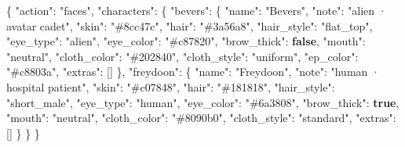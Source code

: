 \documentclass[
  12pt,
  letterpaper,
]{book}
\newenvironment{Shaded}{}{}
\newcommand{\DataTypeTok}[1]{\textcolor[rgb]{0.56,0.13,0.00}{#1}}
\newcommand{\FunctionTok}[1]{\textcolor[rgb]{0.02,0.16,0.49}{#1}}
\newcommand{\KeywordTok}[1]{\textcolor[rgb]{0.00,0.44,0.13}{\textbf{#1}}}
\newcommand{\OtherTok}[1]{\textcolor[rgb]{0.00,0.44,0.13}{#1}}
\newcommand{\StringTok}[1]{\textcolor[rgb]{0.25,0.44,0.63}{#1}}
\begin{document}
\begin{Shaded}
\begin{Highlighting}[]
\FunctionTok{\{}
  \DataTypeTok{"action"}\FunctionTok{:} \StringTok{"faces"}\FunctionTok{,}
  \DataTypeTok{"characters"}\FunctionTok{:} \FunctionTok{\{}
    \DataTypeTok{"bevers"}\FunctionTok{:} \FunctionTok{\{}
      \DataTypeTok{"name"}\FunctionTok{:}        \StringTok{"Bevers"}\FunctionTok{,}
      \DataTypeTok{"note"}\FunctionTok{:}        \StringTok{"alien · avatar cadet"}\FunctionTok{,}
      \DataTypeTok{"skin"}\FunctionTok{:}        \StringTok{"\#8cc47c"}\FunctionTok{,}
      \DataTypeTok{"hair"}\FunctionTok{:}        \StringTok{"\#3a56a8"}\FunctionTok{,}
      \DataTypeTok{"hair\_style"}\FunctionTok{:}  \StringTok{"flat\_top"}\FunctionTok{,}
      \DataTypeTok{"eye\_type"}\FunctionTok{:}    \StringTok{"alien"}\FunctionTok{,}
      \DataTypeTok{"eye\_color"}\FunctionTok{:}   \StringTok{"\#c87820"}\FunctionTok{,}
      \DataTypeTok{"brow\_thick"}\FunctionTok{:}  \KeywordTok{false}\FunctionTok{,}
      \DataTypeTok{"mouth"}\FunctionTok{:}       \StringTok{"neutral"}\FunctionTok{,}
      \DataTypeTok{"cloth\_color"}\FunctionTok{:} \StringTok{"\#202840"}\FunctionTok{,}
      \DataTypeTok{"cloth\_style"}\FunctionTok{:} \StringTok{"uniform"}\FunctionTok{,}
      \DataTypeTok{"ep\_color"}\FunctionTok{:}    \StringTok{"\#c8803a"}\FunctionTok{,}
      \DataTypeTok{"extras"}\FunctionTok{:}      \OtherTok{[]}
    \FunctionTok{\},}
    \DataTypeTok{"freydoon"}\FunctionTok{:} \FunctionTok{\{}
      \DataTypeTok{"name"}\FunctionTok{:}        \StringTok{"Freydoon"}\FunctionTok{,}
      \DataTypeTok{"note"}\FunctionTok{:}        \StringTok{"human · hospital patient"}\FunctionTok{,}
      \DataTypeTok{"skin"}\FunctionTok{:}        \StringTok{"\#c07848"}\FunctionTok{,}
      \DataTypeTok{"hair"}\FunctionTok{:}        \StringTok{"\#181818"}\FunctionTok{,}
      \DataTypeTok{"hair\_style"}\FunctionTok{:}  \StringTok{"short\_male"}\FunctionTok{,}
      \DataTypeTok{"eye\_type"}\FunctionTok{:}    \StringTok{"human"}\FunctionTok{,}
      \DataTypeTok{"eye\_color"}\FunctionTok{:}   \StringTok{"\#6a3808"}\FunctionTok{,}
      \DataTypeTok{"brow\_thick"}\FunctionTok{:}  \KeywordTok{true}\FunctionTok{,}
      \DataTypeTok{"mouth"}\FunctionTok{:}       \StringTok{"neutral"}\FunctionTok{,}
      \DataTypeTok{"cloth\_color"}\FunctionTok{:} \StringTok{"\#8090b0"}\FunctionTok{,}
      \DataTypeTok{"cloth\_style"}\FunctionTok{:} \StringTok{"standard"}\FunctionTok{,}
      \DataTypeTok{"extras"}\FunctionTok{:}      \OtherTok{[]}
    \FunctionTok{\}}
  \FunctionTok{\}}
\FunctionTok{\}}
\end{Highlighting}
\end{Shaded}
\end{document}
